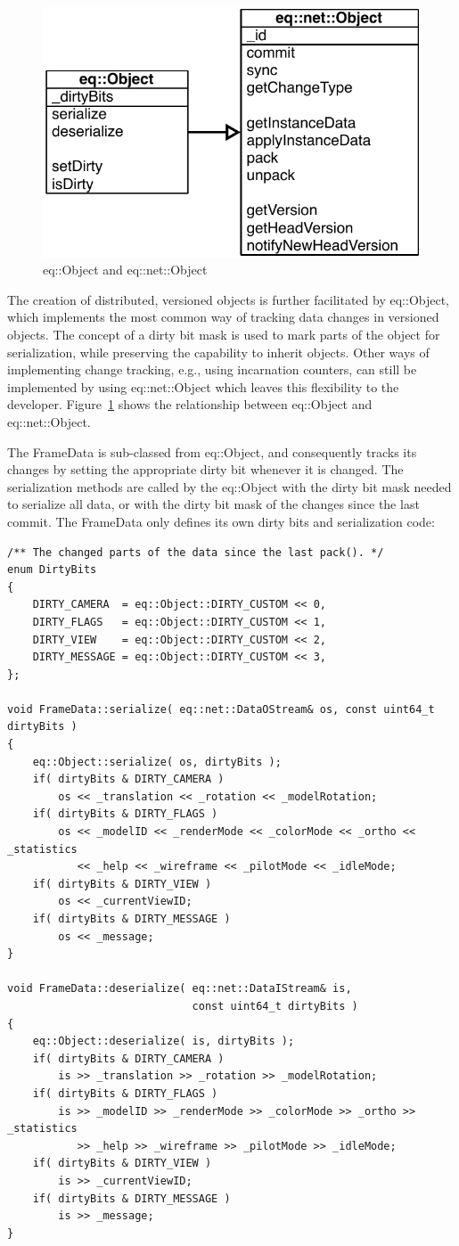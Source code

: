 \documentclass[10pt,a4]{scrartcl}
\newcommand{\fig}[1]{Figure~\ref{#1}}
\begin{document}
\begin{figure}
  \includegraphics[width=.382\textwidth]{images/umlObject.pdf}
  {\caption{\label{fUMLObject}eq::Object and eq::net::Object}}
\end{figure}
The creation of distributed, versioned objects is further facilitated by
\textsf{eq::Object}, which implements the most common way of tracking
data changes in versioned objects. The concept of a dirty bit mask is
used to mark parts of the object for serialization, while preserving the
capability to inherit objects. Other ways of implementing change
tracking, e.g., using incarnation counters, can still be implemented by
using \textsf{eq::net::Object} which leaves this flexibility to the
developer. \fig{fUMLObject} shows the relationship between
\textsf{eq::Object} and \textsf{eq::net::Object}.

The \textsf{FrameData} is sub-classed from \textsf{eq::Object}, and
consequently tracks its changes by setting the appropriate dirty bit
whenever it is changed. The serialization methods are called by the
\textsf{eq::Object} with the dirty bit mask needed to serialize all
data, or with the dirty bit mask of the changes since the last
\textsf{commit}. The \textsf{FrameData} only defines its own dirty bits
and serialization code:

{\footnotesize\begin{lstlisting}
/** The changed parts of the data since the last pack(). */
enum DirtyBits
{
    DIRTY_CAMERA  = eq::Object::DIRTY_CUSTOM << 0,
    DIRTY_FLAGS   = eq::Object::DIRTY_CUSTOM << 1,
    DIRTY_VIEW    = eq::Object::DIRTY_CUSTOM << 2,
    DIRTY_MESSAGE = eq::Object::DIRTY_CUSTOM << 3,
};

void FrameData::serialize( eq::net::DataOStream& os, const uint64_t dirtyBits )
{
    eq::Object::serialize( os, dirtyBits );
    if( dirtyBits & DIRTY_CAMERA )
        os << _translation << _rotation << _modelRotation;
    if( dirtyBits & DIRTY_FLAGS )
        os << _modelID << _renderMode << _colorMode << _ortho << _statistics
           << _help << _wireframe << _pilotMode << _idleMode;
    if( dirtyBits & DIRTY_VIEW )
        os << _currentViewID;
    if( dirtyBits & DIRTY_MESSAGE )
        os << _message;
}

void FrameData::deserialize( eq::net::DataIStream& is,
                             const uint64_t dirtyBits )
{
    eq::Object::deserialize( is, dirtyBits );
    if( dirtyBits & DIRTY_CAMERA )
        is >> _translation >> _rotation >> _modelRotation;
    if( dirtyBits & DIRTY_FLAGS )
        is >> _modelID >> _renderMode >> _colorMode >> _ortho >> _statistics
           >> _help >> _wireframe >> _pilotMode >> _idleMode;
    if( dirtyBits & DIRTY_VIEW )
        is >> _currentViewID;
    if( dirtyBits & DIRTY_MESSAGE )
        is >> _message;
}
\end{lstlisting}}%
\end{document}
